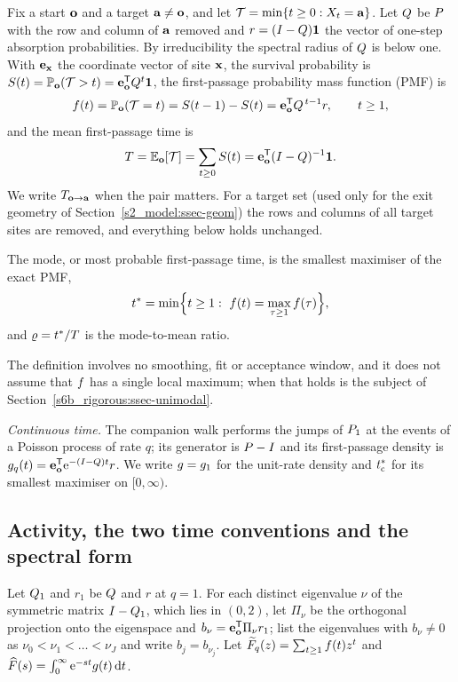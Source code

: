Fix a start $\mathbf{o}$ and a target $\mathbf{a}\neq\mathbf{o}$, and let $\mathcal{T}=\min\{t\ge0:X_t=\mathbf{a}\}$. Let $Q$ be $P$ with the row and
column of $\mathbf{a}$ removed and $r=(I-Q)\mathbf{1}$ the vector of one-step absorption probabilities. By irreducibility the
spectral radius of $Q$ is below one. With $\mathbf{e}_{\mathbf{x}}$ the coordinate vector of site $\mathbf{x}$, the survival probability
is $S(t)=\mathbb{P}_{\mathbf{o}}(\mathcal{T}>t)=\mathbf{e}_{\mathbf{o}}^{\mathsf{T}}Q^{t}\mathbf{1}$, the first-passage probability mass function (PMF) is
\begin{equation}\label{s2_model:eq-pmf}
  f(t)=\mathbb{P}_{\mathbf{o}}(\mathcal{T}=t)=S(t-1)-S(t)=\mathbf{e}_{\mathbf{o}}^{\mathsf{T}}Q^{\,t-1}r,\qquad t\ge1,
\end{equation}
and the mean first-passage time is
\begin{equation}\label{s2_model:eq-T}
  T=\mathbb{E}_{\mathbf{o}}[\mathcal{T}]=\sum_{t\ge0}S(t)=\mathbf{e}_{\mathbf{o}}^{\mathsf{T}}(I-Q)^{-1}\mathbf{1} .
\end{equation}
We write $T_{\mathbf{o}\to\mathbf{a}}$ when the pair matters. For a target set (used only for the exit geometry of
Section~\ref{s2_model:ssec-geom}) the rows and columns of all target sites are removed, and everything below holds
unchanged.

\begin{definition}[Mode]\label{s2_model:def-mode}
The mode, or most probable first-passage time, is the smallest maximiser of the exact PMF,
\[
  \tmode=\min\Bigl\{t\ge1:\ \pmf(t)=\max_{\tau\ge1}\pmf(\tau)\Bigr\},
\]
and $\varrho=t^{*}/T$ is the mode-to-mean ratio.
\end{definition}

The definition involves no smoothing, fit or acceptance window, and it does not assume that $f$ has a single
local maximum; when that holds is the subject of Section~\ref{s6b_rigorous:ssec-unimodal}.

\emph{Continuous time.} The companion walk performs the jumps of $P_1$ at the events of a Poisson process of rate
$q$; its generator is $P-I$ and its first-passage density is $g_q(t)=\mathbf{e}_{\mathbf{o}}^{\mathsf{T}}\mathrm{e}^{-(I-Q)t}r$. We write
$g=g_1$ for the unit-rate density and $t^{*}_{\mathrm{c}}$ for its smallest maximiser on $[0,\infty)$.

\subsection{Activity, the two time conventions and the spectral form}\label{s2_model:ssec-structure}

Let $Q_1$ and $r_1$ be $Q$ and $r$ at $q=1$. For each distinct eigenvalue $\nu$ of the symmetric matrix
$I-Q_1$, which lies in $(0,2)$, let $\Pi_\nu$ be the orthogonal projection onto the eigenspace and
$b_\nu=\mathbf{e}_{\mathbf{o}}^{\mathsf{T}}\Pi_\nu r_1$; list the eigenvalues with $b_\nu\neq0$ as $\nu_0<\nu_1<\dots<\nu_J$ and write
$b_j=b_{\nu_j}$. Let $\widetilde{F}_q(z)=\sum_{t\ge1}f(t)z^{t}$ and $\widehat{F}(s)=\int_0^\infty\mathrm{e}^{-st}g(t)\,\mathrm{d} t$.

